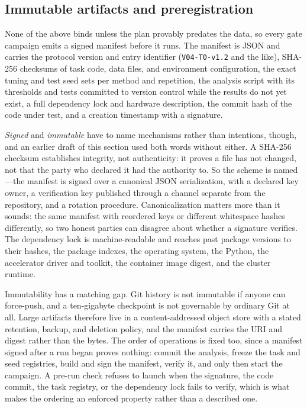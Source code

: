 \subsection{Immutable artifacts and preregistration}

None of the above binds unless the plan provably predates the data,
so every gate campaign emits a signed manifest before it runs. The
manifest is JSON and carries the protocol version and entry
identifier (\texttt{V04-T0-v1.2} and the like), SHA-256 checksums of
task code, data files, and environment configuration, the exact
tuning and test seed sets per method and repetition, the analysis
script with its thresholds and tests committed to version control
while the results do not yet exist, a full dependency lock and
hardware description, the commit hash of the code under test, and a
creation timestamp with a signature.

\emph{Signed} and \emph{immutable} have to name mechanisms rather than
intentions, though, and an earlier draft of this section used both words
without either. A SHA-256 checksum establishes integrity, not
authenticity: it proves a file has not changed, not that the party who
declared it had the authority to. So the scheme is named—the manifest is
signed over a canonical JSON serialization, with a declared key owner, a
verification key published through a channel separate from the
repository, and a rotation procedure. Canonicalization matters more than
it sounds: the same manifest with reordered keys or different whitespace
hashes differently, so two honest parties can disagree about whether a
signature verifies. The dependency lock is machine-readable and reaches
past package versions to their hashes, the package indexes, the operating
system, the Python, the accelerator driver and toolkit, the container
image digest, and the cluster runtime.

Immutability has a matching gap. Git history is not immutable if anyone
can force-push, and a ten-gigabyte checkpoint is not governable by
ordinary Git at all. Large artifacts therefore live in a
content-addressed object store with a stated retention, backup, and
deletion policy, and the manifest carries the URI and digest rather than
the bytes. The order of operations is fixed too, since a manifest signed
after a run began proves nothing: commit the analysis, freeze the task
and seed registries, build and sign the manifest, verify it, and only
then start the campaign. A pre-run check refuses to launch when the
signature, the code commit, the task registry, or the dependency lock
fails to verify, which is what makes the ordering an enforced property
rather than a described one.

